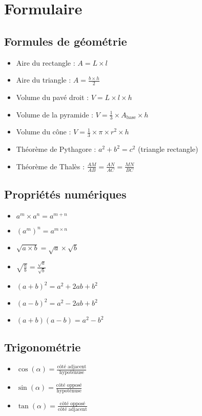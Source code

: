 \chapter{Formulaire}

\section{Formules de géométrie}
\begin{itemize}
  \item Aire du rectangle : $A = L \times l$
  \item Aire du triangle : $A = \frac{b \times h}{2}$
  \item Volume du pavé droit : $V = L \times l \times h$
  \item Volume de la pyramide : $V = \frac{1}{3} \times A_{\text{base}} \times h$
  \item Volume du cône : $V = \frac{1}{3} \times \pi \times r^2 \times h$
  \item Théorème de Pythagore : $a^2 + b^2 = c^2$ (triangle rectangle)
  \item Théorème de Thalès : $\frac{AM}{AB} = \frac{AN}{AC} = \frac{MN}{BC}$
\end{itemize}

\section{Propriétés numériques}
\begin{itemize}
  \item $a^m \times a^n = a^{m+n}$
  \item $(a^m)^n = a^{m \times n}$
  \item $\sqrt{a \times b} = \sqrt{a} \times \sqrt{b}$
  \item $\sqrt{\frac{a}{b}} = \frac{\sqrt{a}}{\sqrt{b}}$
  \item $(a + b)^2 = a^2 + 2ab + b^2$
  \item $(a - b)^2 = a^2 - 2ab + b^2$
  \item $(a + b)(a - b) = a^2 - b^2$
\end{itemize}

\section{Trigonométrie}
\begin{itemize}
  \item $\cos(\alpha) = \frac{\text{côté adjacent}}{\text{hypoténuse}}$
  \item $\sin(\alpha) = \frac{\text{côté opposé}}{\text{hypoténuse}}$
  \item $\tan(\alpha) = \frac{\text{côté opposé}}{\text{côté adjacent}}$
\end{itemize} 